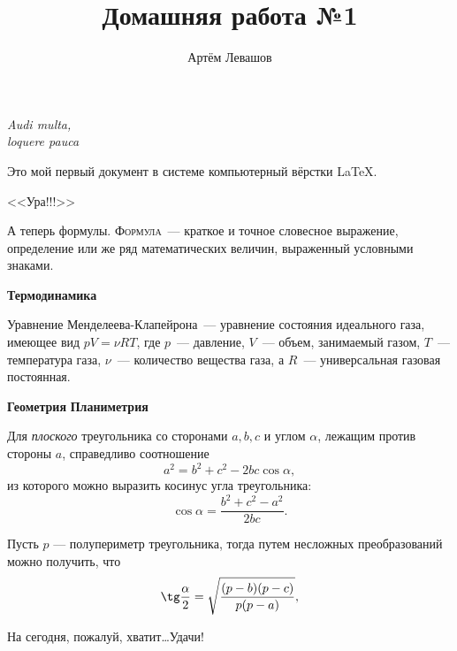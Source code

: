 \documentclass[12pt]{article}
\title{Домашняя работа №1}
\author{Артём Левашов}
\date{}
\begin{document}
	\maketitle
	\begin{flushright}
		{\itshape Audi multa,\\loquere pauca}
	\end{flushright}
	\vspace{20pt}
	Это мой первый документ в системе компьютерный вёрстки \LaTeX.
	\begin{center}
		\textsf{\huge{<<Ура!!!>>}}
	\end{center}
	\par А теперь формулы. \textsc{Формула}~--- краткое и точное словесное выражение, 
	определение или же ряд математических величин, выраженный условными знаками.
	
	\vspace{15pt}
	\hspace{28pt} \textbf{\large{Термодинамика}}
	\par Уравнение Менделеева-Клапейрона~--- уравнение состояния идеального газа,
	имеющее вид $pV = \nu RT$, где $p$~--- давление, $V$~--- объем, занимаемый газом, 
	$T$~--- температура газа, $\nu$~--- количество вещества газа, а $R$~--- универсальная 
	газовая постоянная.
	
	\vspace{15pt}
	\hspace{28pt} \textbf{\large{Геометрия}} \hfill \textbf{\large{Планиметрия}}
	\par Для \textit{плоского} треугольника со сторонами $a, b, c$ и углом $\alpha$, 
	лежащим против стороны $a$, справедливо соотношение
	\[
		a^2 = b^2 + c^2 - 2bc\cos\alpha,
	\]
	из которого можно выразить косинус угла треугольника:
	\[
		\cos\alpha = \frac{b^2 + c^2 - a^2}{2bc}.
	\]
	\par Пусть $p$ --- полупериметр треугольника, тогда путем несложных преобразований
	можно получить, что
	\[
		\tg\frac{\alpha}{2} = \sqrt{\frac{(p-b)(p-c)}{p(p-a)}},	
	\]
	
	\vspace{1cm}
	\begin{flushleft}
		На сегодня, пожалуй, хватит\dots Удачи!
	\end{flushleft}
\end{document}
